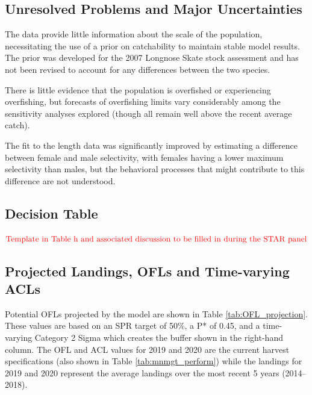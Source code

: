 \documentclass[12pt,]{article}
\begin{document}
\FloatBarrier

\hypertarget{unresolved-problems-and-major-uncertainties}{%
\subsection*{Unresolved Problems and Major
Uncertainties}\label{unresolved-problems-and-major-uncertainties}}

The data provide little information about the scale of the population,
necessitating the use of a prior on catchability to maintain stable
model results. The prior was developed for the 2007 Longnose Skate stock
assessment and has not been revised to account for any differences
between the two species.

There is little evidence that the population is overfished or
experiencing overfishing, but forecasts of overfishing limits vary
considerably among the sensitivity analyses explored (though all remain
well above the recent average catch).

The fit to the length data was significantly improved by estimating a
difference between female and male selectivity, with females having a
lower maximum selectivity than males, but the behavioral processes that
might contribute to this difference are not understood.

\FloatBarrier

\hypertarget{decision-table}{%
\subsection*{Decision Table}\label{decision-table}}

\textbf{\(\color{red}{\text{Template in Table h and associated discussion to be filled in during the STAR panel}}\)}

\FloatBarrier

\hypertarget{projected-landings-ofls-and-time-varying-acls}{%
\subsection*{Projected Landings, OFLs and Time-varying
ACLs}\label{projected-landings-ofls-and-time-varying-acls}}

Potential OFLs projected by the model are shown in Table
\ref{tab:OFL_projection}. These values are based on an SPR target of
50\%, a P* of 0.45, and a time-varying Category 2 Sigma which creates
the buffer shown in the right-hand column. The OFL and ACL values for
2019 and 2020 are the current harvest specifications (also shown in
Table \ref{tab:mnmgt_perform}) while the landings for 2019 and 2020
represent the average landings over the most recent 5 years
(2014--2018).
\end{document}
